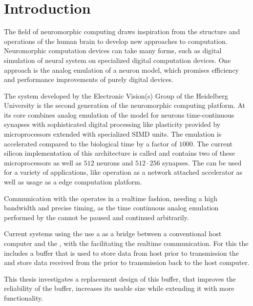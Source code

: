\section{Introduction}
The field of neuromorphic computing draws inspiration from the structure and operations of the human brain to develop new approaches to computation. Neuromorphic computation devices can take many forms, such as digital simulation of neural system on specialized digital computation devices\autocite{ref:spinnaker}. One approach is the analog emulation of a neuron model, which promises efficiency and performance improvements of purely digital devices.

The \BSSTwo{} system developed by the Electronic Vision(s) Group of the Heidelberg University is the second generation of the \BSS{} neuromorphic computing platform. At its core combines analog emulation of the \AdEx{}\autocite{ref:adex} model for neurons time-continuous synapses with sophisticated digital processing like plasticity provided by microprocessors extended with specialized SIMD units. The emulation is accelerated compared to the biological time by a factor of $\num{1000}$. The current silicon implementation of this architecture is called \HICANNX{} and contains two of these microprocessors as well as $\num{512}$ neurons and $\num{512} · \num{256}$ synapses. The \HICANNX{} \ASIC{} can be used for a variety of applications, like operation as a network attached accelerator\autocite{ref:network_accelerator} as well as usage as a edge computation platform\autocite{ref:mobile_system}.

Communication with the \HICANNX{} \ASIC{} operates in a realtime fashion, needing a high bandwidth and precise timing, as the time continuous analog emulation performed by the \ASIC{} cannot be paused and continued arbitrarily.

Current systems using the \HICANNX{} \ASIC{} use a \FPGA{} as a bridge between a conventional host computer and the \ASIC{}, with the \FPGA{} facilitating the realtime communication. For this the \FPGA{} includes a buffer that is used to store data from host prior to transmission the \ASIC{} and store data received from the \ASIC{} prior to transmission back to the host computer.

This thesis investigates a replacement design of this buffer, that improves the reliability of the buffer, increases its usable size while extending it with more functionality.

